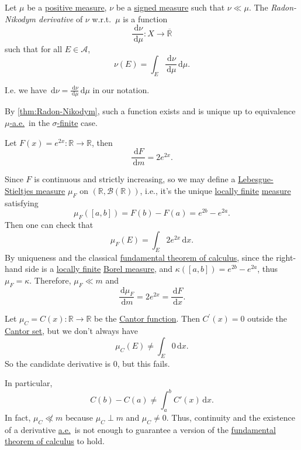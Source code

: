\begin{definition}\label{def:Radon-Nikodym-derivative}
	Let \(\mu\) be a \hyperref[def:signed-measure]{positive measure}, \(\nu\) be a \hyperref[def:signed-measure]{signed measure} such that \(\nu \ll \mu\). The \emph{Radon-Nikodym derivative} of \(\nu\) w.r.t.\ \(\mu\) is a function
	\[
		\frac{\,\mathrm{d} \nu}{\,\mathrm{d} \mu} \colon X \to \overline{\mathbb{R}}
	\]
	such that for all \(E \in \mathcal{A}\),
	\[
		\nu(E) = \int_E \frac{\,\mathrm{d} \nu}{\,\mathrm{d} \mu} \,\mathrm{d} \mu.
	\]
\end{definition}

\begin{remark}
	I.e. we have \(\,\mathrm{d} \nu = \frac{\,\mathrm{d} \nu}{\,\mathrm{d} \mu} \,\mathrm{d} \mu\) in our notation.
\end{remark}

\begin{note}
	By \autoref{thm:Radon-Nikodym}, such a function exists and is unique up to equivalence \hyperref[def:mu-almost-everywhere]{\(\mu\)-a.e.}\ in the \hyperref[def:finite-signed-measure]{\(\sigma\)-finite} case.
\end{note}

\begin{eg}
	Let \(F(x) = e^{2x} \colon \mathbb{R} \to \mathbb{R}\), then
	\[
		\frac{\,\mathrm{d} F}{\,\mathrm{d} m} = 2e^{2x}.
	\]
\end{eg}
\begin{explanation}
	Since \(F\) is continuous and strictly increasing, so we may define a \hyperref[def:Lebesgue-Stieltjes-measure]{Lebesgue-Stieltjes measure} \(\mu_F\) on \((\mathbb{R}, \mathcal{B}(\mathbb{R}))\), i.e., it's the unique \hyperref[def:locally-finite]{locally finite} \hyperref[def:measure]{measure} satisfying
	\[
		\mu_F([a,b]) = F(b) - F(a) = e^{2b} - e^{2a}.
	\]
	Then one can check that
	\[
		\mu_F(E) = \int_E 2e^{2x} \,\mathrm{d} x.
	\]
	By uniqueness and the classical \underline{fundamental theorem of calculus}, since the right-hand side is a \hyperref[def:locally-finite]{locally finite} \hyperref[def:Borel-measure]{Borel measure}, and \(\kappa([a,b]) = e^{2b} - e^{2a}\), thus \(\mu_F = \kappa\). Therefore, \(\mu_F \ll m\) and
	\[
		\frac{\,\mathrm{d} \mu_F}{\,\mathrm{d} m} = 2e^{2x} = \frac{\,\mathrm{d} F}{\,\mathrm{d} x}.
	\]
\end{explanation}

\begin{eg}
	Let \(\mu _C = C(x) \colon \mathbb{R} \to \mathbb{R}\) be the \hyperref[sssec:Cantor-Function]{Cantor function}. Then \(C^\prime(x) = 0\) outside the \hyperref[eg:lec8:Cantor-set]{Cantor set}, but we don't always have
	\[
		\mu_C(E) \neq \int_E 0 \,\mathrm{d} x.
	\]
	So the candidate derivative is \(0\), but this fails.
\end{eg}
\begin{explanation}
	In particular,
	\[
		C(b) - C(a) \neq \int_a^b C'(x) \,\mathrm{d} x.
	\]
	In fact, \(\mu_C \not\ll m\) because \(\mu_C \perp m\) and \(\mu_C \neq 0\). Thus, continuity and the existence of a derivative \hyperref[def:mu-almost-everywhere]{a.e.}\ is not enough to guarantee a version of the \underline{fundamental theorem of calculus} to hold.
\end{explanation}